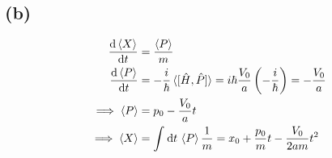 \documentclass[letter, 10pts]{article}
\newcommand{\hb}{\hbar}
\begin{document}
\subsection*{(b)} 
\begin{align*}
	\frac{\mathrm{d} \braket{X }}{\mathrm{d} t} &= \frac{\braket{ P}}{m} \\
	\frac{\mathrm{d} \braket{P }}{\mathrm{d} t} &= - \frac{i}{\hb} \braket{[\hat{H} , \hat{P}]} 
= i \hb \frac{V_0}{ a} \left(- \frac{i}{\hb}\right) = - \frac{V_0}{a}
	\\
	\implies \braket{ P} &= p_0 - \frac{V_0}{a}t
	\\ \implies
	\braket{ X} &=  \int_{}^{} \mathrm{d} t \, \braket{ P} \frac{1}{m} = x_0 + \frac{p_0}{m}t  - \frac{V_0}{2 a m } t^2  \\
\end{align*}

\end{document}
